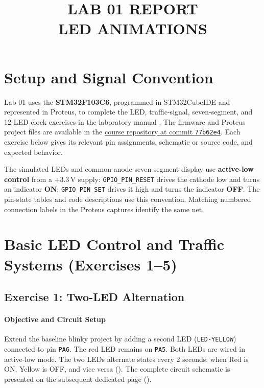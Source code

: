 \documentclass[oneside,final]{hcmut-report}
\title{LAB 01 REPORT\\LED ANIMATIONS}
\begin{document}
\coverpage

\tableofcontents
\vspace{1.5em}
\listoffigures
\vspace{1.5em}
\listoftables
\vspace{1.5em}
\lstlistoflistings
\clearpage

\section{Setup and Signal Convention}
\label{sec:intro}

Lab 01 uses the \textbf{STM32F103C6}, programmed in STM32CubeIDE and represented in Proteus, to complete the LED, traffic-signal, seven-segment, and 12-LED clock exercises in the laboratory manual \cite{nhanlab}. The firmware and Proteus project files are available in the \href{https://github.com/tapstoptap/microcontroller-261/commit/77b62e494c47b4563374bc61c562bf9e5548d887}{course repository at commit \texttt{77b62e4}}. Each exercise below gives its relevant pin assignments, schematic or source code, and expected behavior.

The simulated LEDs and common-anode seven-segment display use \textbf{active-low control} from a $+3.3\,\text{V}$ supply: \texttt{GPIO\_PIN\_RESET} drives the cathode low and turns an indicator \textbf{ON}; \texttt{GPIO\_PIN\_SET} drives it high and turns the indicator \textbf{OFF}. The pin-state tables and code descriptions use this convention. Matching numbered connection labels in the Proteus captures identify the same net.

\clearpage

\section{Basic LED Control and Traffic Systems (Exercises 1--5)}
\label{sec:ex1to5}

\subsection{Exercise 1: Two-LED Alternation}
\label{subsec:ex1}
\enlargethispage{2.5\baselineskip}
\paragraph{Objective and Circuit Setup}
Extend the baseline blinky project by adding a second LED (\texttt{LED-YELLOW}) connected to pin \texttt{PA6}. The red LED remains on \texttt{PA5}. Both LEDs are wired in active-low mode. The two LEDs alternate states every 2 seconds: when Red is ON, Yellow is OFF, and vice versa (). The complete circuit schematic is presented on the subsequent dedicated page ().
\end{document}
